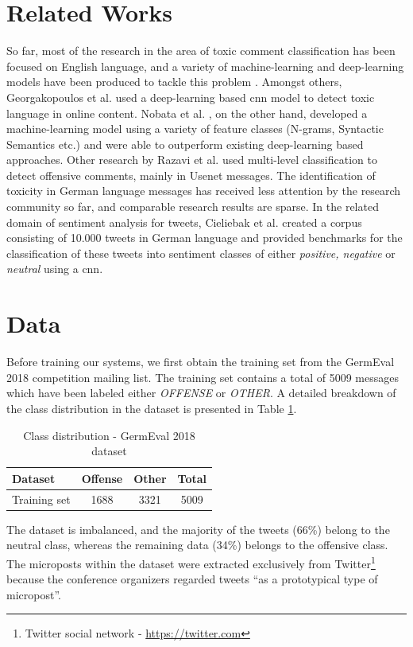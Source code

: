 \documentclass[11pt]{article}
\begin{document}
\section{Related Works}
So far, most of the research in the area of toxic comment classification has been focused on English language, and a variety of machine-learning and deep-learning models have been produced to tackle this problem \cite{RN56}.  Amongst others, Georgakopoulos et al.  used a deep-learning based \ac{cnn} model to detect toxic language in online content. Nobata et al. , on the other hand, developed a machine-learning model using a variety of feature classes (N-grams, Syntactic Semantics etc.) and were able to outperform existing deep-learning based approaches. Other research by Razavi et al.  used multi-level classification to detect offensive comments, mainly in Usenet messages. 
\newline
The identification of toxicity in German language messages has received less attention by the research community so far, and comparable research results are sparse. In the related domain of sentiment analysis for tweets, Cieliebak et al.  created a corpus consisting of 10.000 tweets in German language and provided benchmarks for the classification of these tweets into sentiment classes of either \textit{positive, negative} or \textit{neutral} using a \ac{cnn}.   

\section{Data}
\label{sec:data}
Before training our systems, we first obtain the training set from the GermEval 2018 competition mailing list. The training set contains a total of 5009 messages which have been labeled either \textit{OFFENSE} or \textit{OTHER}. A detailed breakdown of the class distribution in the dataset is presented in Table \ref{tbl:dataset}.
\begin{table}[h]
\begin{center}
\begin{tabular}{l c c c }
\toprule \bf Dataset &  Offense &  Other &  Total \\ \midrule
Training set & 1688 & 3321 & 5009 \\
\bottomrule
\end{tabular}
\end{center}
\caption{\label{tbl:dataset} Class distribution - GermEval 2018 dataset}
\end{table}
\newline
The dataset is imbalanced, and the majority of the tweets (66\%) belong to the neutral class, whereas the remaining data (34\%) belongs to the offensive class. The microposts within the dataset were extracted exclusively from Twitter\footnote{Twitter social network - \url{https://twitter.com}} because the conference organizers regarded tweets \enquote{as a prototypical type of micropost}\footnotemark[2].
\end{document}
